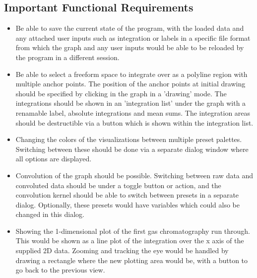 \documentclass{article}
\begin{document}
\subsection{Important Functional Requirements}
\begin{itemize}
    \item Be able to save the current state of the program, with the loaded data and any attached user inputs such as integration or labels in a specific file format from which the graph and any user inputs would be able to be reloaded by the program in a different session. 
	\item Be able to select a freeform space to integrate over as a polyline region with multiple anchor points. The position of the anchor points at initial drawing should be specified by clicking in the graph in a 'drawing' mode. The integrations should be shown in an 'integration list' under the graph with a renamable label, absolute integrations and mean sums. The integration areas should be destructible via a button which is shown within the integration list.
	\item Changing the colors of the visualizations between multiple preset palettes. Switching between these should be done via a separate dialog window where all options are displayed.
	\item Convolution of the graph should be possible. Switching between raw data and convoluted data should be under a toggle button or action, and the convolution kernel should be able to switch between presets in a separate dialog. Optionally, these presets would have variables which could also be changed in this dialog.
	\item Showing the 1-dimensional plot of the first gas chromatography run through. This would be shown as a line plot of the integration over the x axis of the supplied 2D data. Zooming and tracking the eye would be handled by drawing a rectangle where the new plotting area would be, with a button to go back to the previous view.
\end{itemize}
\end{document}
